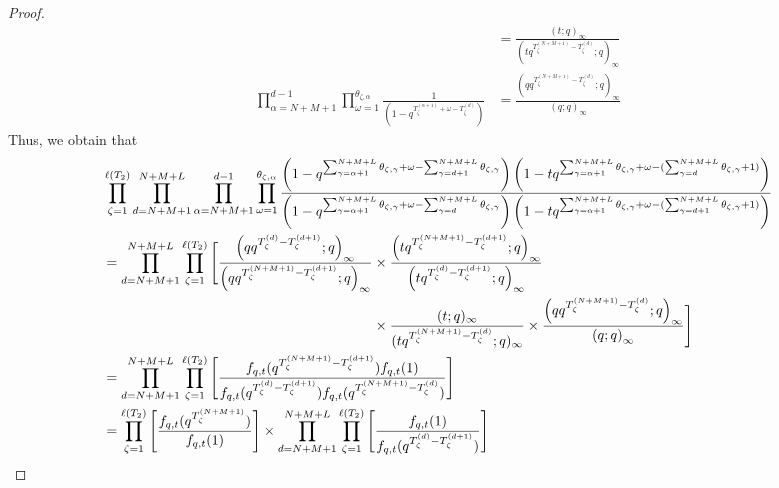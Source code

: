 \documentclass[12pt,reqno,a4paper]{amsart}
\numberwithin{equation}{section}
\theoremstyle{definition}
\begin{document}
\begin{proof}
\begin{align}
&= 
\frac{
	(t;q)_{\infty}
}{
	(tq^{T^{(N+M+1)}_{\zeta} - T^{(d)}_{\zeta}} ; q)_{\infty}
}
\\
\prod_{\alpha = N+M+1}^{d - 1} 
\prod_{\omega = 1}^{\theta_{\zeta,\alpha}}
\frac{
	1
}{
	\left(	1 - q^{	T^{(\alpha + 1)}_{\zeta}		+ \omega - T^{(d)}_{\zeta}		}			\right)
}
&= 
\frac{
	\left(	qq^{T^{(N+M+1)}_{\zeta} - T^{(d)}_{\zeta}}	; q	\right)_\infty
}{		
	\left(	q	; q	\right)_\infty
}
\end{align}
\normalsize
Thus, we obtain that 
\footnotesize
\begin{align}
	&\prod_{\zeta = 1}^{\ell(T_2)}
	\prod_{d = N+M+1}^{N+M+L}
	\prod_{\alpha = N+M+1}^{d - 1} 
	\prod_{\omega = 1}^{\theta_{\zeta,\alpha}}
	\frac{
		\left(	1 - q^{	\sum_{\gamma = \alpha + 1}^{N + M + L} \theta_{\zeta,\gamma}	+ \omega - \sum_{\gamma = d+1}^{N + M + L}\theta_{\zeta,\gamma} 		}			\right)
		\left(	1 - tq^{	\sum_{\gamma = \alpha + 1}^{N + M + L} \theta_{\zeta,\gamma}	+ \omega - (\sum_{\gamma = d}^{N + M + L}\theta_{\zeta,\gamma} 	+ 1 )	}		\right)
	}{
		\left(	1 - q^{	\sum_{\gamma = \alpha + 1}^{N + M + L} \theta_{\zeta,\gamma}	+ \omega - \sum_{\gamma = d}^{N + M + L}\theta_{\zeta,\gamma} 		}			\right)
		\left(	1 - 	tq^{	\sum_{\gamma = \alpha + 1}^{N + M + L} \theta_{\zeta,\gamma}	+ \omega - (\sum_{\gamma = d + 1}^{N + M + L}\theta_{\zeta,\gamma} 	+ 1 )	}			\right)
	}
	\notag 
	\\
	&= 
	\prod_{d = N+M+1}^{N+M+L}
	\prod_{\zeta = 1}^{\ell(T_2)}
	\Bigg[
	\frac{
		\left(	qq^{T^{(d)}_{\zeta} - T^{(d+1)}_{\zeta}}	; q	\right)_\infty
	}{
		\left(	qq^{T^{(N+M+1)}_{\zeta} - T^{(d+1)}_{\zeta}}	; q	\right)_\infty
	} 
	\times 
	\frac{
		\left(	tq^{T^{(N+M+1)}_{\zeta} - T^{(d+1)}_{\zeta}}	; q	\right)_\infty
	}{
		\left(	tq^{T^{(d)}_{\zeta} - T^{(d+1)}_{\zeta}}	; q	\right)_\infty
	} 
	\notag 
	\\
	&\hspace{6.8cm}\times 
	\frac{
		(t;q)_{\infty}
	}{
		(tq^{T^{(N+M+1)}_{\zeta} - T^{(d)}_{\zeta}} ; q)_{\infty}
	} 
	\times
	\frac{
		\left(	qq^{T^{(N+M+1)}_{\zeta} - T^{(d)}_{\zeta}}	; q	\right)_\infty
	}{		
		\left(	q	; q	\right)_\infty
	}
	\Bigg]
	\notag 
	\\
	&= 
	\prod_{d = N+M+1}^{N+M+L}
	\prod_{\zeta = 1}^{\ell(T_2)}
	\left[
	\frac{
		f_{q,t}(q^{T^{(N+M+1)}_{\zeta} - T^{(d+1)}_{\zeta}})f_{q,t}(1)
	}{
		f_{q,t}(q^{T^{(d)}_{\zeta} - T^{(d+1)}_{\zeta}})f_{q,t}(q^{T^{(N+M+1)}_{\zeta} - T^{(d)}_{\zeta}})
	}
	\right]
	\notag 
	\\
	&=
	\prod_{\zeta = 1}^{\ell(T_2)}
	\left[
	\frac{
		f_{q,t}(q^{T^{(N+M+1)}_{\zeta} 		})
	}{
		f_{q,t}(1	)
	}
	\right]
	\times
	\prod_{d = N+M+1}^{N+M+L}
	\prod_{\zeta = 1}^{\ell(T_2)}
	\left[
	\frac{
		f_{q,t}(1)
	}{
		f_{q,t}(q^{T^{(d)}_{\zeta} - T^{(d+1)}_{\zeta}})
	}
	\right]
\end{align}
\normalsize
\end{proof}
\end{document}
